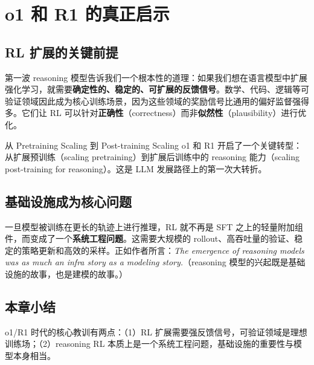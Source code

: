 \section{o1 和 R1 的真正启示}

\subsection{RL 扩展的关键前提}

第一波 reasoning 模型告诉我们一个根本性的道理：如果我们想在语言模型中扩展强化学习，就需要\textbf{确定性的、稳定的、可扩展的反馈信号}。数学、代码、逻辑等可验证领域因此成为核心训练场景，因为这些领域的奖励信号比通用的偏好监督强得多。它们让 RL 可以针对\textbf{正确性}（correctness）而非\textbf{似然性}（plausibility）进行优化。

\begin{knowledgebox}{从 Pretraining Scaling 到 Post-training Scaling}
o1 和 R1 开启了一个关键转型：从扩展预训练（scaling pretraining）到扩展后训练中的 reasoning 能力（scaling post-training for reasoning）。这是 LLM 发展路径上的第一次大转折。
\end{knowledgebox}

\subsection{基础设施成为核心问题}

一旦模型被训练在更长的轨迹上进行推理，RL 就不再是 SFT 之上的轻量附加组件，而变成了一个\textbf{系统工程问题}。这需要大规模的 rollout、高吞吐量的验证、稳定的策略更新和高效的采样。正如作者所言：\textit{The emergence of reasoning models was as much an infra story as a modeling story.}（reasoning 模型的兴起既是基础设施的故事，也是建模的故事。）

\subsection{本章小结}

o1/R1 时代的核心教训有两点：（1）RL 扩展需要强反馈信号，可验证领域是理想训练场；（2）reasoning RL 本质上是一个系统工程问题，基础设施的重要性与模型本身相当。


